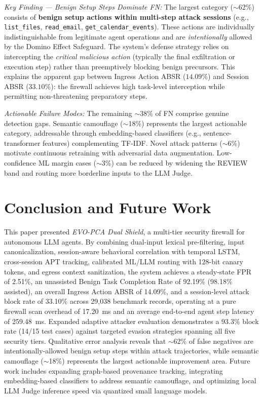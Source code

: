 \documentclass[runningheads]{llncs}
\begin{document}
\textit{Key Finding --- Benign Setup Steps Dominate FN:} The largest category ($\sim$62\%) consists of \textbf{benign setup actions within multi-step attack sessions} (e.g., \texttt{list\_files}, \texttt{read\_email}, \texttt{get\_calendar\_events}). These actions are individually indistinguishable from legitimate agent operations and are \textit{intentionally} allowed by the Domino Effect Safeguard. The system's defense strategy relies on intercepting the \textit{critical malicious action} (typically the final exfiltration or execution step) rather than preemptively blocking benign precursors. This explains the apparent gap between Ingress Action ABSR ($14.09\%$) and Session ABSR ($33.10\%$): the firewall achieves high task-level interception while permitting non-threatening preparatory steps.

\textit{Actionable Failure Modes:} The remaining $\sim$38\% of FN comprise genuine detection gaps. Semantic camouflage ($\sim$18\%) represents the largest actionable category, addressable through embedding-based classifiers (e.g., sentence-transformer features) complementing TF-IDF. Novel attack patterns ($\sim$6\%) motivate continuous retraining with adversarial data augmentation. Low-confidence ML margin cases ($\sim$3\%) can be reduced by widening the REVIEW band and routing more borderline inputs to the LLM Judge.

\section{Conclusion and Future Work}
This paper presented \textit{EVO-PCA Dual Shield}, a multi-tier security firewall for autonomous LLM agents. By combining dual-input lexical pre-filtering, input canonicalization, session-aware behavioral correlation with temporal LSTM, cross-session APT tracking, calibrated ML/LLM routing with 128-bit canary tokens, and egress context sanitization, the system achieves a steady-state FPR of 2.51\%, an unassisted Benign Task Completion Rate of 92.19\% (98.18\% assisted), an overall Ingress Action ABSR of 14.09\%, and a session-level attack block rate of 33.10\% across 29,038 benchmark records, operating at a pure firewall scan overhead of 17.20~ms and an average end-to-end agent step latency of 259.48~ms. Expanded adaptive attacker evaluation demonstrates a 93.3\% block rate (14/15 test cases) against targeted evasion strategies spanning all five security tiers. Qualitative error analysis reveals that $\sim$62\% of false negatives are intentionally-allowed benign setup steps within attack trajectories, while semantic camouflage ($\sim$18\%) represents the largest actionable improvement area. Future work includes expanding graph-based provenance tracking, integrating embedding-based classifiers to address semantic camouflage, and optimizing local LLM Judge inference speed via quantized small language models.
\end{document}

